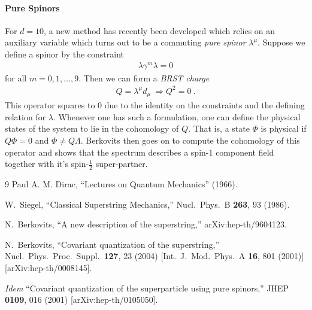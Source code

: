 \documentclass[12pt]{article}
\begin{document}
\paragraph{Pure Spinors} For $d=10$, a new method has recently been developed \cite{Berkovits:2000wm} which relies on an auxiliary variable which turns out to be a commuting {\em pure spinor} $\lambda^\mu$. Suppose we define a spinor by the constraint 
\begin{eqnarray}
\lambda \gamma^m \lambda=0
\end{eqnarray}
for all $m=0,1, \dots, 9$. Then we can form a {\em BRST charge} 
\begin{eqnarray}
Q=\lambda^\mu d_\mu~\Rightarrow Q^2=0~.
\end{eqnarray}
This operator squares to 0 due to the identity on the constraints and the defining relation for $\lambda$. Whenever one has such a formulation, one can define the physical states of the system to lie in the cohomology of $Q$. That is, a state $\Phi$ is physical if $Q\Phi=0$ and $\Phi\neq Q \Lambda$. Berkovits then goes on to compute the cohomology of this operator and shows that the spectrum describes a spin-1 component field together with it's spin-$\frac12$ super-partner. 




\begin{thebibliography}{9}
 Paul A. M. Dirac, ``Lectures on Quantum Mechanics'' (1966).

  W.~Siegel,
  ``Classical Superstring Mechanics,''
  Nucl.\ Phys.\  B {\bf 263}, 93 (1986).

  N.~Berkovits,
  ``A new description of the superstring,''
  arXiv:hep-th/9604123.
  
  N.~Berkovits,
  ``Covariant quantization of the superstring,''
  Nucl.\ Phys.\ Proc.\ Suppl.\  {\bf 127}, 23 (2004)
  [Int.\ J.\ Mod.\ Phys.\  A {\bf 16}, 801 (2001)]
  [arXiv:hep-th/0008145].

	{\it Idem}
  ``Covariant quantization of the superparticle using pure spinors,''
  JHEP {\bf 0109}, 016 (2001)
  [arXiv:hep-th/0105050].

\end{thebibliography}
\end{document}
